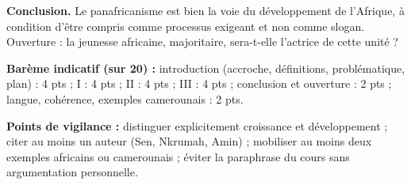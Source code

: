\documentclass[11pt]{article}
\begin{document}
\begin{corrige}
\textbf{Conclusion.} Le panafricanisme est bien la voie du développement de l'Afrique, à condition d'être compris comme processus exigeant et non comme slogan. Ouverture : la jeunesse africaine, majoritaire, sera-t-elle l'actrice de cette unité ?

\textbf{Barème indicatif (sur 20) :} introduction (accroche, définitions, problématique, plan) : 4 pts ; I : 4 pts ; II : 4 pts ; III : 4 pts ; conclusion et ouverture : 2 pts ; langue, cohérence, exemples camerounais : 2 pts.

\textbf{Points de vigilance :} distinguer explicitement croissance et développement ; citer au moins un auteur (Sen, Nkrumah, Amin) ; mobiliser au moins deux exemples africains ou camerounais ; éviter la paraphrase du cours sans argumentation personnelle.
\end{corrige}
\end{document}

